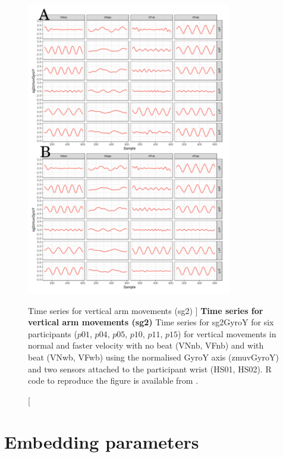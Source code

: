 \begin{figure}
\centering
\includegraphics[width=0.8\textwidth]{tssg2gyroY}
	\caption
	[Time series for vertical arm movements (sg2) ]{
	{\bf Time series for vertical arm movements (sg2)}
		Time series for sg2GyroY for six participants 
		($p01$, $p04$, $p05$, $p10$, $p11$, $p15$) 
		for vertical movements in normal and faster velocity with
		no beat	(VNnb, VFnb) and with beat (VNwb, VFwb) using 
		the normalised GyroY axis (zmuvGyroY) and 
		two sensors attached to the participant wrist (HS01, HS02).
	R code to reproduce the figure is available from \cite{xochicale2018}.
	}
    \label{fig:tssg2gyroY-hii}
\end{figure}







\newpage
\section{Embedding parameters} \label{appendix:d:ep}
